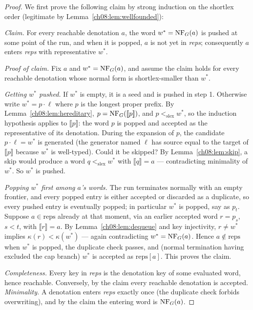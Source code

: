 \begin{proof}
We first prove the following claim by strong induction on the shortlex
order (legitimate by Lemma~\ref{ch08:lem:wellfounded}):

\medskip
\noindent\emph{Claim.} For every reachable denotation $a$, the word
$w^\ast=\mathrm{NF}_G(a)$ is pushed at some point of the run, and when it is popped,
$a$ is not yet in \emph{reps}; consequently $a$ enters \emph{reps} with
representative $w^\ast$.

\medskip
\noindent\emph{Proof of claim.} Fix $a$ and $w^\ast=\mathrm{NF}_G(a)$, and assume
the claim holds for every reachable denotation whose normal form is
shortlex-smaller than $w^\ast$.

\emph{Getting $w^\ast$ pushed.} If $w^\ast$ is empty, it is a seed and is
pushed in step 1. Otherwise write $w^\ast=p\cdot\ell$ where $p$ is the
longest proper prefix. By Lemma~\ref{ch08:lem:hereditary},
$p=\mathrm{NF}_G([\![ p]\!])$, and $p<_{\mathrm{slex}}w^\ast$, so the
induction hypothesis applies to $\llbracket p\rrbracket$: the word $p$ is
popped and accepted as the representative of its denotation. During the
expansion of $p$, the candidate $p\cdot\ell=w^\ast$ is generated (the
generator named $\ell$ has source equal to the target of
$\llbracket p\rrbracket$ because $w^\ast$ is well-typed). Could it be
skipped? By Lemma~\ref{ch08:lem:skip}, a skip would produce a word
$q<_{\mathrm{slex}}w^\ast$ with $\llbracket q\rrbracket=a$ ---
contradicting minimality of $w^\ast$. So $w^\ast$ is pushed.

\emph{Popping $w^\ast$ first among $a$'s words.} The run terminates
normally with an empty frontier, and every popped entry is either accepted
or discarded as a duplicate, so every pushed entry is eventually popped; in
particular $w^\ast$ is popped, say as $p_t$. Suppose $a\in\text{reps}$
already at that moment, via an earlier accepted word $r=p_s$, $s<t$, with
$\llbracket r\rrbracket=a$. By Lemma~\ref{ch08:lem:dequeue} and key
injectivity, $r\ne w^\ast$ implies $\kappa(r)<\kappa(w^\ast)$ --- again
contradicting $w^\ast=\mathrm{NF}_G(a)$. Hence $a\notin\text{reps}$ when $w^\ast$
is popped, the duplicate check passes, and (normal termination having
excluded the cap branch) $w^\ast$ is accepted as $\text{reps}[a]$. This
proves the claim.

\medskip
\emph{Completeness.} Every key in \emph{reps} is the denotation key of some
evaluated word, hence reachable. Conversely, by the claim every reachable
denotation is accepted. \emph{Minimality.} A denotation enters \emph{reps}
exactly once (the duplicate check forbids overwriting), and by the claim the
entering word is $\mathrm{NF}_G(a)$.
\end{proof}

